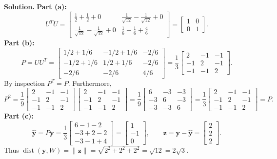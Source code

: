 \documentclass[11pt, letterpaper]{article}
\theoremstyle{definition}
\theoremstyle{remark}
\begin{document}
\textbf{Solution.}
\textbf{Part (a):}
\[
U^T U = \begin{bmatrix} \frac{1}{2} + \frac{1}{2} + 0 & \frac{1}{\sqrt{12}} - \frac{1}{\sqrt{12}} + 0 \\ \frac{1}{\sqrt{12}} - \frac{1}{\sqrt{12}} + 0 & \frac{1}{6} + \frac{1}{6} + \frac{4}{6} \end{bmatrix} = \begin{bmatrix} 1 & 0 \\ 0 & 1 \end{bmatrix}.
\]
\textbf{Part (b):}
\[
P = UU^T = \begin{bmatrix} 1/2 + 1/6 & -1/2 + 1/6 & -2/6 \\ -1/2 + 1/6 & 1/2 + 1/6 & -2/6 \\ -2/6 & -2/6 & 4/6 \end{bmatrix} = \frac{1}{3}\begin{bmatrix} 2 & -1 & -1 \\ -1 & 2 & -1 \\ -1 & -1 & 2 \end{bmatrix}.
\]
By inspection $P^T = P$. Furthermore,
\[
P^2 = \frac{1}{9}\begin{bmatrix} 2 & -1 & -1 \\ -1 & 2 & -1 \\ -1 & -1 & 2 \end{bmatrix}\begin{bmatrix} 2 & -1 & -1 \\ -1 & 2 & -1 \\ -1 & -1 & 2 \end{bmatrix} = \frac{1}{9}\begin{bmatrix} 6 & -3 & -3 \\ -3 & 6 & -3 \\ -3 & -3 & 6 \end{bmatrix} = \frac{1}{3}\begin{bmatrix} 2 & -1 & -1 \\ -1 & 2 & -1 \\ -1 & -1 & 2 \end{bmatrix} = P.
\]
\textbf{Part (c):}
\[
\hat{\mathbf{y}} = P\mathbf{y} = \frac{1}{3}\begin{bmatrix} 6 - 1 - 2 \\ -3 + 2 - 2 \\ -3 - 1 + 4 \end{bmatrix} = \begin{bmatrix} 1 \\ -1 \\ 0 \end{bmatrix}, \qquad \mathbf{z} = \mathbf{y} - \hat{\mathbf{y}} = \begin{bmatrix} 2 \\ 2 \\ 2 \end{bmatrix}.
\]
Thus $\operatorname{dist}(\mathbf{y}, W) = \|\mathbf{z}\| = \sqrt{2^2 + 2^2 + 2^2} = \sqrt{12} = 2\sqrt{3}$.
\end{document}
